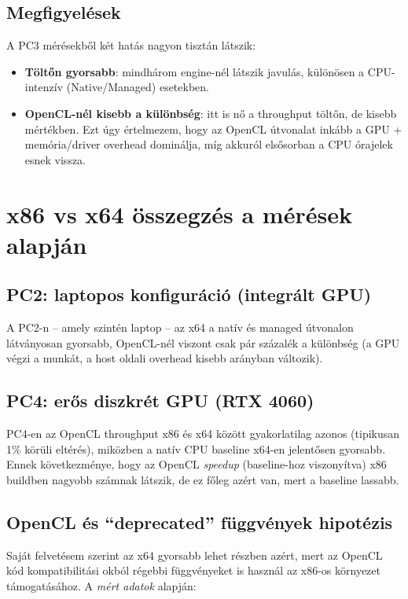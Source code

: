 \subsection{Megfigyelések}

A PC3 mérésekből két hatás nagyon tisztán látszik:

\begin{itemize}
  \item \textbf{Töltőn gyorsabb}: mindhárom engine-nél látszik javulás, különösen a CPU-intenzív (Native/Managed) esetekben.
  \item \textbf{OpenCL-nél kisebb a különbség}: itt is nő a throughput töltőn, de kisebb mértékben.
        Ezt úgy értelmezem, hogy az OpenCL útvonalat inkább a GPU + memória/driver overhead dominálja, míg akkuról elsősorban a CPU órajelek esnek vissza.
\end{itemize}

\section{x86 vs x64 összegzés a mérések alapján}

\subsection{PC2: laptopos konfiguráció (integrált GPU)}

A PC2-n -- amely szintén laptop -- az x64 a natív és managed útvonalon látványosan gyorsabb,
OpenCL-nél viszont csak pár százalék a különbség (a GPU végzi a munkát, a host oldali overhead kisebb arányban változik).

\subsection{PC4: erős diszkrét GPU (RTX 4060)}

PC4-en az OpenCL throughput x86 és x64 között gyakorlatilag azonos (tipikusan 1\% körüli eltérés),
miközben a natív CPU baseline x64-en jelentősen gyorsabb.
Ennek következménye, hogy az OpenCL \emph{speedup} (baseline-hoz viszonyítva) x86 buildben nagyobb számnak látszik,
de ez főleg azért van, mert a baseline lassabb.

\subsection{OpenCL és ``deprecated'' függvények hipotézis}

Saját felvetésem szerint az x64 gyorsabb lehet részben azért, mert az OpenCL kód
kompatibilitási okból régebbi függvényeket is használ az x86-os környezet támogatásához. A \emph{mért adatok} alapján:

